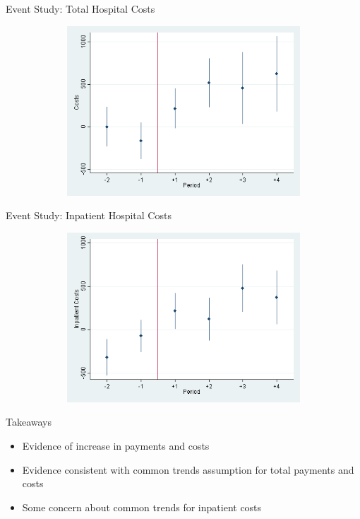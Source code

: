 \documentclass[t,aspectratio=169]{beamer}
\begin{document}
\begin{frame}{Event Study: Total Hospital Costs}
    \begin{figure}
        \centering
        \includegraphics[height=2.5in,width=5in,keepaspectratio]{EventCharge_All_2011}
    \end{figure}
\end{frame}

\begin{frame}{Event Study: Inpatient Hospital Costs}
    \begin{figure}
        \centering
        \includegraphics[height=2.5in,width=5in,keepaspectratio]{EventCharge_IP_2011}
    \end{figure}
\end{frame}


\begin{frame}{Takeaways}
    \begin{itemize}
        \item Evidence of increase in payments and costs
        \item Evidence consistent with common trends assumption for total payments and costs
        \item Some concern about common trends for inpatient costs
    \end{itemize}
\end{frame}
\end{document}
